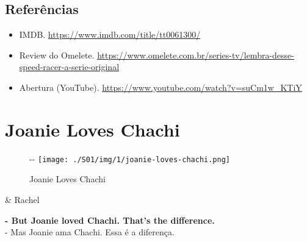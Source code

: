 \hypertarget{referuxeancias-4}{%
\subsection{Referências}\label{referuxeancias-4}}

\begin{itemize}
\tightlist
\item
  \sloppy IMDB. \url{https://www.imdb.com/title/tt0061300/}
\item
  \sloppy Review do Omelete. \url{https://www.omelete.com.br/series-tv/lembra-desse-speed-racer-a-serie-original}
\item
  \sloppy Abertura (YouTube). \url{https://www.youtube.com/watch?v=suCm1w_KTiY}
\end{itemize}

\hypertarget{joanie-loves-chachi}{%
\section{Joanie Loves Chachi}\label{joanie-loves-chachi}}

\begin{figure}[!ht]
  \begin{adjustwidth}{-\oddsidemargin-1in}{-\rightmargin}
    \centering
    \texttt{[image: ./S01/img/1/joanie-loves-chachi.png]}
    \caption{Joanie Loves Chachi\label{fig:joanie-loves-chachi}}
  \end{adjustwidth}
\end{figure}

\begin{tcolorbox}[enhanced,center upper,
    drop fuzzy shadow southeast, boxrule=0.3pt,
    lower separated=false,
    colframe=black!30!dialogoBorder,colback=white]
\begin{minipage}[c]{0.14\linewidth}
   & \centering \scriptsize{Rachel}
\end{minipage}
\hspace{.1mm}
\begin{minipage}[c]{0.8\linewidth}
  \textbf{- But Joanie loved Chachi. That's the difference.}\\
  - Mas Joanie ama Chachi. Essa é a diferença.
\end{minipage}
\end{tcolorbox}

